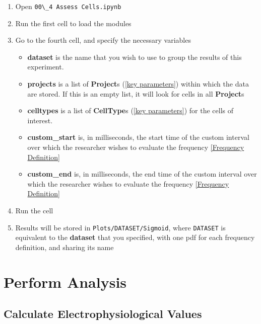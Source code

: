 \documentclass{article}
\begin{document}
\begin{enumerate}
    \item Open \verb|00\_4 Assess Cells.ipynb|
    
    \item Run the first cell to load the modules
    
    \item Go to the fourth cell, and specify the necessary variables
    
    \begin{itemize}
        \item \textbf{dataset} is the name that you wish to use to group the results of this experiment.
        
        \item \textbf{projects} is a list of \textbf{Project}s (\ref{key parameters}) within which the data are stored. If this is an empty list, it will look for cells in all \textbf{Project}s
        
        \item \textbf{celltypes} is a list of \textbf{CellType}s (\ref{key parameters}) for the cells of interest.
        
        \item \textbf{custom\_start} is, in milliseconds, the start time of the custom interval over which the researcher wishes to evaluate the frequency \ref{Frequency Definition}
        
        \item \textbf{custom\_end} is, in milliseconds, the end time of the custom interval over which the researcher wishes to evaluate the frequency \ref{Frequency Definition}
    \end{itemize}
    
    \item Run the cell
    
    \item Results will be stored in \verb|Plots/DATASET/Sigmoid|, where \verb|DATASET| is equivalent to the \textbf{dataset} that you specified, with one pdf for each frequency definition, and sharing its name
\end{enumerate}

\section{Perform Analysis}

\subsection{Calculate Electrophysiological Values} \label{Calculate Ephys}
\end{document}
